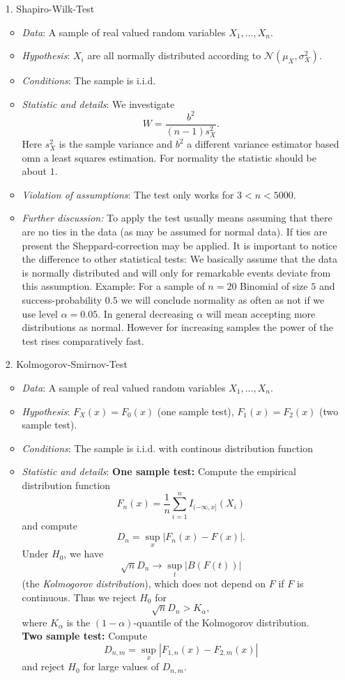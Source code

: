 \documentclass[12pt,a4paper]{amsart}
\theoremstyle{definition}
\theoremstyle{remark}
\numberwithin{equation}{section}
\begin{document}
\begin{itemize}
\item[1.] Shapiro-Wilk-Test
\begin{itemize}
\item \textit{Data}:  A sample of real valued random variables $X_1,...,X_n$.
\item \textit{Hypothesis}: $X_i$ are all normally distributed according to $\mathcal{N}(\mu_X, \sigma_X^2)$.
\item \textit{Conditions}: The sample is i.i.d.
\item \textit{Statistic and details}: We investigate
$$W=\frac{b^2}{(n-1)s_X^2}.$$
Here $s_X^2$ is the sample variance and $b^2$ a different variance estimator based omn a least squares estimation. For normality the statistic should be about $1$.
\item \textit{Violation of assumptions}:
The test only works for $3<n<5000$. 

\item \textit{Further discussion:} To apply the test usually means assuming that there are no ties in the data (as may be assumed for normal data). If ties are present the Sheppard-correction may be applied.  It is important to notice the difference to other statistical tests: We basically assume that the data is normally distributed and will only for remarkable events deviate from this assumption. Example: For a sample of $n=20$ Binomial of size $5$ and success-probability $0.5$ we will conclude normality as often as not if we use level $\alpha=0.05$. In general decreasing $\alpha$ will mean accepting more distributions as normal. However for increasing samples the power of the test rises comparatively fast. \\


\end{itemize}
\item[2.] Kolmogorov-Smirnov-Test
\begin{itemize}
\item \textit{Data}:  A sample of real valued random variables $X_1,...,X_n$.
\item \textit{Hypothesis}: $F_X(x)=F_0(x)$ (one sample test), $F_1(x)=F_2(x)$ (two sample test). 
\item \textit{Conditions}: The sample is i.i.d. with continous distribution function
\item \textit{Statistic and details}: \textbf{One sample test:} Compute the empirical distribution function $$F_n(x)=\frac{1}{n}\sum_{i=1}^n I_{(-\infty,x]}(X_i)$$ and compute $$D_n=\sup_x \left|F_n(x)-F(x)\right|.$$ Under $H_0$, we have $$\sqrt{n} D_n \rightarrow \sup_{t} \left|B(F(t))\right|$$ (the \textit{Kolmogorov distribution}), which does not depend on $F$ if $F$ is continuous. Thus we reject $H_0$ for $$\sqrt{n}D_n>K_{\alpha},$$ where $K_{\alpha}$ is the $(1-\alpha)$-quantile of the Kolmogorov distribution. \\
\textbf{Two sample test:} Compute $$D_{n,m}=\sup_{x} \left|F_{1,n}(x)-F_{2,m}(x)\right|$$ and reject $H_0$ for large values of $D_{n,m}$. 

\end{itemize}

\end{itemize}
\end{document}
